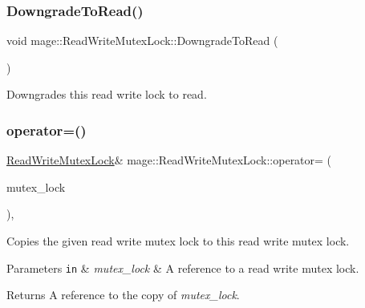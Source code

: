 \subsubsection{\texorpdfstring{Downgrade\+To\+Read()}{DowngradeToRead()}}
{\footnotesize\ttfamily void mage\+::\+Read\+Write\+Mutex\+Lock\+::\+Downgrade\+To\+Read (\begin{DoxyParamCaption}{ }\end{DoxyParamCaption})}

Downgrades this read write lock to read. \hypertarget{structmage_1_1_read_write_mutex_lock_ade82a57f337e39a1515f67fbc1f6fc43}{}\label{structmage_1_1_read_write_mutex_lock_ade82a57f337e39a1515f67fbc1f6fc43} 
\subsubsection{\texorpdfstring{operator=()}{operator=()}}
{\footnotesize\ttfamily \hyperlink{structmage_1_1_read_write_mutex_lock}{Read\+Write\+Mutex\+Lock}\& mage\+::\+Read\+Write\+Mutex\+Lock\+::operator= (\begin{DoxyParamCaption}\item[{const \hyperlink{structmage_1_1_read_write_mutex_lock}{Read\+Write\+Mutex\+Lock} \&}]{mutex\+\_\+lock }\end{DoxyParamCaption})\hspace{0.3cm}{\ttfamily [private]}, {\ttfamily [delete]}}

Copies the given read write mutex lock to this read write mutex lock.


\begin{DoxyParams}[1]{Parameters}
\mbox{\tt in}  & {\em mutex\+\_\+lock} & A reference to a read write mutex lock. \\
\hline
\end{DoxyParams}
\begin{DoxyReturn}{Returns}
A reference to the copy of {\itshape mutex\+\_\+lock}. 
\end{DoxyReturn}
\hypertarget{structmage_1_1_read_write_mutex_lock_a01843784e8dbf0d3dfd6100562f699be}{}\label{structmage_1_1_read_write_mutex_lock_a01843784e8dbf0d3dfd6100562f699be} 
